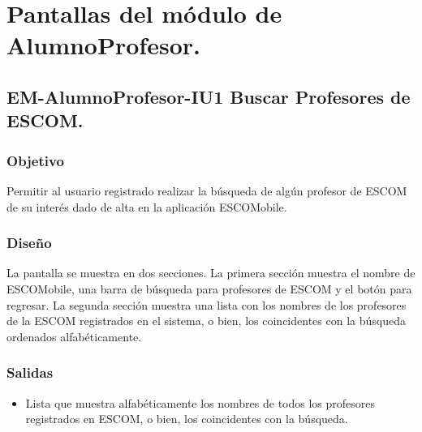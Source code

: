 





\section{Pantallas del módulo de AlumnoProfesor.}

\subsection{EM-AlumnoProfesor-IU1 Buscar Profesores de ESCOM.}

\subsubsection{Objetivo}
	\noindent
	Permitir al usuario registrado realizar la búsqueda de algún profesor de ESCOM de su interés dado
	de alta en la aplicación ESCOMobile.

\subsubsection{Diseño}
	\noindent
	La pantalla se muestra en dos secciones. La primera sección muestra el nombre de ESCOMobile, una barra de búsqueda para profesores de ESCOM y el botón para regresar. La segunda sección muestra una lista con los nombres de los profesores de la ESCOM registrados en el sistema, o bien, los coincidentes con la búsqueda ordenados alfabéticamente. 

\pagebreak
{}

\subsubsection{Salidas}
	\noindent
	\begin{itemize}
		\item Lista que muestra alfabéticamente los nombres de todos los profesores registrados en ESCOM, o bien, los coincidentes con la búsqueda. 
	\end{itemize}

